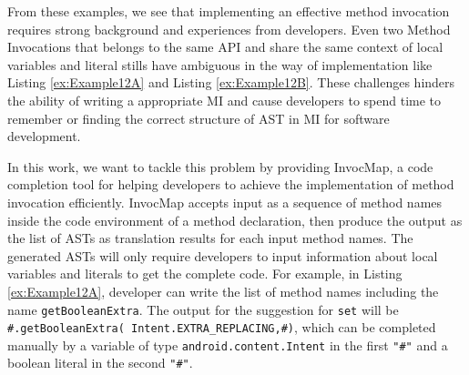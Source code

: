 From these examples, we see that implementing an effective method invocation requires strong background and experiences from developers. Even two Method Invocations that belongs to the same API and share the same context of local variables and literal stills have ambiguous in the way of implementation like Listing \ref{ex:Example12A} and Listing \ref{ex:Example12B}. These challenges hinders the ability of writing a appropriate MI and cause developers to spend time to remember or finding the correct structure of AST in MI for software development.

In this work, we want to tackle this problem by providing InvocMap, a code completion tool for helping developers to achieve the implementation of method invocation efficiently. InvocMap accepts input as a sequence of method names inside the code environment of a method declaration, then produce the output as the list of ASTs as translation results for each input method names. The generated ASTs will only require developers to input information about local variables and literals to get the complete code. For example, in Listing \ref{ex:Example12A}, developer can write the list of method names including the name \texttt{getBooleanExtra}. The output for the suggestion for \texttt{set} will be \texttt{\#.getBooleanExtra( Intent.EXTRA\_REPLACING,\#)}, which can be completed manually by a variable of type \texttt{android.content.Intent} in the first \texttt{"\#"} and a boolean literal in the second \texttt{"\#"}.

